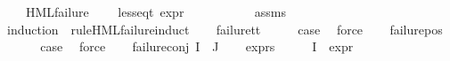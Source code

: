 \begin{isabellebody}
\ \ \ {\isachardoublequoteopen}HML{\isacharunderscore}{\kern0pt}failure\ {\isasymphi}{\isachardoublequoteclose}\isanewline
\ \ \ {\isachardoublequoteopen}{\isacharparenleft}{\kern0pt}less{\isacharunderscore}{\kern0pt}eq{\isacharunderscore}{\kern0pt}t\ {\isacharparenleft}{\kern0pt}expr\ {\isasymphi}{\isacharparenright}{\kern0pt}\ {\isacharparenleft}{\kern0pt}{\isasyminfinity}{\isacharcomma}{\kern0pt}\ {}{\isacharcomma}{\kern0pt}\ {}{\isacharcomma}{\kern0pt}\ {}{\isacharcomma}{\kern0pt}\ {}{\isacharcomma}{\kern0pt}\ {}{\isacharparenright}{\kern0pt}{\isacharparenright}{\kern0pt}{\isachardoublequoteclose}\isanewline
%
\isadelimproof
\ \ %
\endisadelimproof
%
\isatagproof
{}\isamarkupfalse%
\ assms\isanewline
{}\isamarkupfalse%
{\isacharparenleft}{\kern0pt}induction\ {\isasymphi}\ rule{\isacharcolon}{\kern0pt}HML{\isacharunderscore}{\kern0pt}failure{\isachardot}{\kern0pt}induct{\isacharparenright}{\kern0pt}\isanewline
\ \ \isamarkupfalse%
\ failure{\isacharunderscore}{\kern0pt}tt\isanewline
\ \ \isamarkupfalse%
\ \isamarkupfalse%
\ {\isacharquery}{\kern0pt}case\ \isamarkupfalse%
\ force\isanewline
{}\isamarkupfalse%
\isanewline
\ \ \isamarkupfalse%
\ {\isacharparenleft}{\kern0pt}failure{\isacharunderscore}{\kern0pt}pos\ {\isasymphi}\ {\isasymalpha}{\isacharparenright}{\kern0pt}\isanewline
\ \ \isamarkupfalse%
\ \isamarkupfalse%
\ {\isacharquery}{\kern0pt}case\ \isamarkupfalse%
\ force\isanewline
{}\isamarkupfalse%
\isanewline
\ \ \isamarkupfalse%
\ {\isacharparenleft}{\kern0pt}failure{\isacharunderscore}{\kern0pt}conj\ I\ {\isasymPhi}\ J{\isacharparenright}{\kern0pt}\isanewline
\ \ \isamarkupfalse%
\ expr{\isacharunderscore}{\kern0pt}{\isasympsi}s{\isacharcolon}{\kern0pt}\ {\isachardoublequoteopen}{\isasymforall}{\isasymphi}{\isachardot}{\kern0pt}\ {\isasymphi}\ {\isasymin}\ {\isasymPhi}\ {\isacharbackquote}{\kern0pt}\ I\ {\isasymlongrightarrow}\ expr\ {\isasymphi}\ {\isacharequal}{\kern0pt}\ {\isacharparenleft}{\kern0pt}{}{\isacharcomma}{\kern0pt}\ {}{\isacharcomma}{\kern0pt}\ {}{\isacharcomma}{\kern0pt}\ {}{\isacharcomma}{\kern0pt}\ {}{\isacharcomma}{\kern0pt}\ {}{\isacharparenright}{\kern0pt}{\isachardoublequoteclose}\isanewline
\ \ \ \ \isamarkupfalse%

\end{isabellebody}

